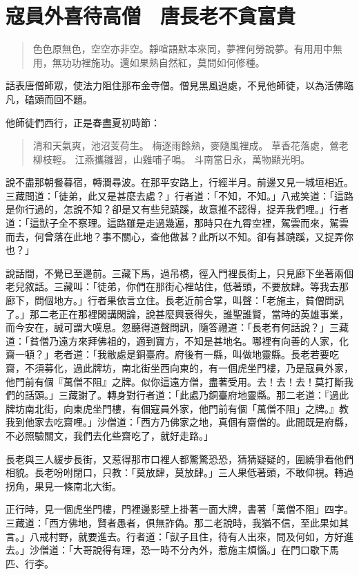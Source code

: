 
\chapter{寇員外喜待高僧　唐長老不貪富貴}

\begin{quote}
色色原無色，空空亦非空。靜喧語默本來同，夢裡何勞說夢。有用用中無用，無功功裡施功。還如果熟自然紅，莫問如何修種。
\end{quote}

話表唐僧師眾，使法力阻住那布金寺僧。僧見黑風過處，不見他師徒，以為活佛臨凡，磕頭而回不題。

他師徒們西行，正是春盡夏初時節：
\begin{quote}
清和天氣爽，池沼芰荷生。
梅逐雨餘熟，麥隨風裡成。
草香花落處，鶯老柳枝輕。
江燕攜雛習，山雞哺子鳴。
斗南當日永，萬物顯光明。
\end{quote}

說不盡那朝餐暮宿，轉澗尋波。在那平安路上，行經半月。前邊又見一城垣相近。三藏問道：「徒弟，此又是甚麼去處？」行者道：「不知，不知。」八戒笑道：「這路是你行過的，怎說不知？卻是又有些兒蹺蹊，故意推不認得，捉弄我們哩。」行者道：「這獃子全不察理。這路雖是走過幾遍，那時只在九霄空裡，駕雲而來，駕雲而去，何曾落在此地？事不關心，查他做甚？此所以不知。卻有甚蹺蹊，又捉弄你也？」

說話間，不覺已至邊前。三藏下馬，過吊橋，徑入門裡長街上，只見廊下坐著兩個老兒敘話。三藏叫：「徒弟，你們在那街心裡站住，低著頭，不要放肆。等我去那廊下，問個地方。」行者果依言立住。長老近前合掌，叫聲：「老施主，貧僧問訊了。」那二老正在那裡閑講閑論，說甚麼興衰得失，誰聖誰賢，當時的英雄事業，而今安在，誠可謂大嘆息。忽聽得道聲問訊，隨答禮道：「長老有何話說？」三藏道：「貧僧乃遠方來拜佛祖的，適到寶方，不知是甚地名。哪裡有向善的人家，化齋一頓？」老者道：「我敝處是銅臺府。府後有一縣，叫做地靈縣。長老若要吃齋，不須募化，過此牌坊，南北街坐西向東的，有一個虎坐門樓，乃是寇員外家，他門前有個『萬僧不阻』之牌。似你這遠方僧，盡著受用。去！去！去！莫打斷我們的話頭。」三藏謝了。轉身對行者道：「此處乃銅臺府地靈縣。那二老道：『過此牌坊南北街，向東虎坐門樓，有個寇員外家，他門前有個「萬僧不阻」之牌。』教我到他家去吃齋哩。」沙僧道：「西方乃佛家之地，真個有齋僧的。此間既是府縣，不必照驗關文，我們去化些齋吃了，就好走路。」

長老與三人緩步長街，又惹得那市口裡人都驚驚恐恐，猜猜疑疑的，圍繞爭看他們相貌。長老吩咐閉口，只教：「莫放肆，莫放肆。」三人果低著頭，不敢仰視。轉過拐角，果見一條南北大街。

正行時，見一個虎坐門樓，門裡邊影壁上掛著一面大牌，書著「萬僧不阻」四字。三藏道：「西方佛地，賢者愚者，俱無詐偽。那二老說時，我猶不信，至此果如其言。」八戒村野，就要進去。行者道：「獃子且住，待有人出來，問及何如，方好進去。」沙僧道：「大哥說得有理，恐一時不分內外，惹施主煩惱。」在門口歇下馬匹、行李。

